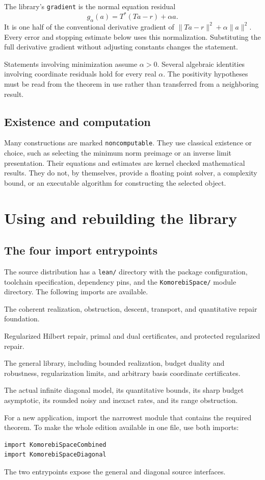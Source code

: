 \documentclass[11pt]{article}
\newcommand{\leanname}[1]{{\small\ttfamily\nolinkurl{#1}}}
\newcommand{\guidechapter}[1]{\par\Needspace{8\baselineskip}\section{#1}}
\begin{document}
The library's \leanname{gradient} is the normal equation residual
\[
 g_\alpha(a)=T^*(Ta-r)+\alpha a.
\]
It is one half of the conventional derivative gradient of $\|Ta-r\|^2+\alpha\|a\|^2$. Every error and stopping estimate below uses this normalization. Substituting the full derivative gradient without adjusting constants changes the statement.

Statements involving minimization assume $\alpha>0$. Several algebraic identities involving coordinate residuals hold for every real $\alpha$. The positivity hypotheses must be read from the theorem in use rather than transferred from a neighboring result.

\subsection{Existence and computation}
Many constructions are marked \leanname{noncomputable}. They use classical existence or choice, such as selecting the minimum norm preimage or an inverse limit presentation. Their equations and estimates are kernel checked mathematical results. They do not, by themselves, provide a floating point solver, a complexity bound, or an executable algorithm for constructing the selected object.

\guidechapter{Using and rebuilding the library}
\subsection{The four import entrypoints}
The source distribution has a \leanname{lean/} directory with the package configuration, toolchain specification, dependency pins, and the \leanname{KomorebiSpace/} module directory. The following imports are available.
\begin{description}[style=nextline]
\item[\leanname{KomorebiSpace}] The coherent realization, obstruction, descent, transport, and quantitative repair foundation.
\item[\leanname{KomorebiSpaceRegularization}] Regularized Hilbert repair, primal and dual certificates, and protected regularized repair.
\item[\leanname{KomorebiSpaceCombined}] The general library, including bounded realization, budget duality and robustness, regularization limits, and arbitrary basis coordinate certificates.
\item[\leanname{KomorebiSpaceDiagonal}] The actual infinite diagonal model, its quantitative bounds, its sharp budget asymptotic, its rounded noisy and inexact rates, and its range obstruction.
\end{description}
For a new application, import the narrowest module that contains the required theorem. To make the whole edition available in one file, use both imports:
\begin{verbatim}
import KomorebiSpaceCombined
import KomorebiSpaceDiagonal
\end{verbatim}
The two entrypoints expose the general and diagonal source interfaces.
\end{document}
